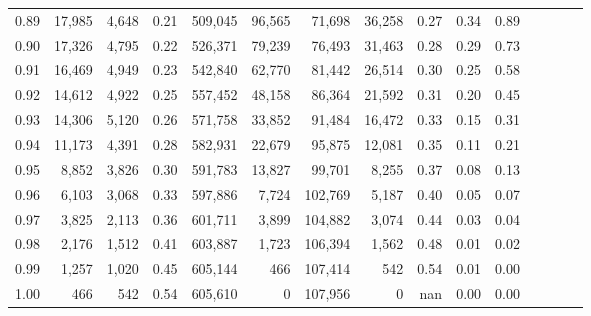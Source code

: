 \begin{tabular}{rrrcrrrrrrrrrrr}
0.89 &  17,985 &  4,648 &                                       0.21 &  509,045 &   96,565 &   71,698 &   36,258 &  0.27 &  0.34 &                         0.89 \\
0.90 &  17,326 &  4,795 &                                       0.22 &  526,371 &   79,239 &   76,493 &   31,463 &  0.28 &  0.29 &                         0.73 \\
0.91 &  16,469 &  4,949 &                                       0.23 &  542,840 &   62,770 &   81,442 &   26,514 &  0.30 &  0.25 &                         0.58 \\
0.92 &  14,612 &  4,922 &                                       0.25 &  557,452 &   48,158 &   86,364 &   21,592 &  0.31 &  0.20 &                         0.45 \\
0.93 &  14,306 &  5,120 &                                       0.26 &  571,758 &   33,852 &   91,484 &   16,472 &  0.33 &  0.15 &                         0.31 \\
0.94 &  11,173 &  4,391 &                                       0.28 &  582,931 &   22,679 &   95,875 &   12,081 &  0.35 &  0.11 &                         0.21 \\
0.95 &   8,852 &  3,826 &                                       0.30 &  591,783 &   13,827 &   99,701 &    8,255 &  0.37 &  0.08 &                         0.13 \\
0.96 &   6,103 &  3,068 &                                       0.33 &  597,886 &    7,724 &  102,769 &    5,187 &  0.40 &  0.05 &                         0.07 \\
0.97 &   3,825 &  2,113 &                                       0.36 &  601,711 &    3,899 &  104,882 &    3,074 &  0.44 &  0.03 &                         0.04 \\
0.98 &   2,176 &  1,512 &                                       0.41 &  603,887 &    1,723 &  106,394 &    1,562 &  0.48 &  0.01 &                         0.02 \\
0.99 &   1,257 &  1,020 &                                       0.45 &  605,144 &      466 &  107,414 &      542 &  0.54 &  0.01 &                         0.00 \\
1.00 &     466 &    542 &                                       0.54 &  605,610 &        0 &  107,956 &        0 &   nan &  0.00 &                         0.00 \\
\bottomrule
\end{tabular}
